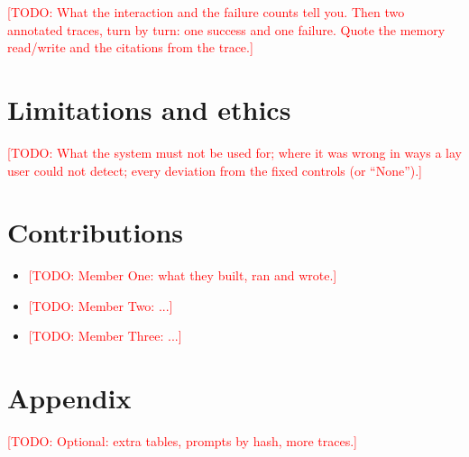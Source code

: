 \documentclass[11pt]{article}
\newcommand{\todo}[1]{\textcolor{red}{[TODO: #1]}}
\begin{document}
\todo{What the interaction and the failure counts tell you. Then two annotated traces, turn by turn:
one success and one failure. Quote the memory read/write and the citations from the trace.}

\section{Limitations and ethics}
\todo{What the system must not be used for; where it was wrong in ways a lay user could not detect;
every deviation from the fixed controls (or ``None'').}

\section*{Contributions}
\begin{itemize}[leftmargin=*,nosep]
\item \todo{Member One: what they built, ran and wrote.}
\item \todo{Member Two: ...}
\item \todo{Member Three: ...}
\end{itemize}

\appendix
\section{Appendix}
\todo{Optional: extra tables, prompts by hash, more traces.}
\end{document}
